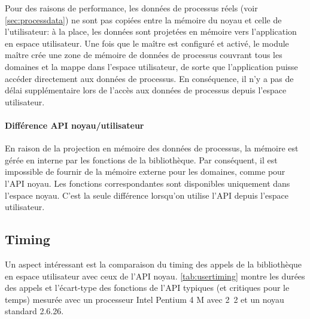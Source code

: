 \documentclass[a4paper,12pt,BCOR6mm,bibtotoc,idxtotoc]{scrbook}
\begin{document}
Pour des raisons de performance, les donn\'ees de processus r\'eels
(voir \autoref{sec:processdata}) ne sont pas copi\'ees entre la
m\'emoire du noyau et celle de l'utilisateur: \`a la place, les
donn\'ees sont projet\'ees en m\'emoire vers l'application en espace
utilisateur.  Une fois que le ma\^itre est configur\'e et activ\'e, le
module ma\^itre cr\'ee une zone de m\'emoire de donn\'ees de processus
couvrant tous les domaines et la mappe dans l'espace utilisateur, de
sorte que l'application puisse acc\'eder directement aux donn\'ees de
processus. En cons\'equence, il n'y a pas de d\'elai suppl\'ementaire lors
de l'acc\`es aux donn\'ees de processus depuis l'espace utilisateur.

\paragraph{Diff\'erence API noyau/utilisateur}
En raison de la projection en m\'emoire des donn\'ees de processus, la
m\'emoire est g\'er\'ee en interne par les fonctions de la biblioth\`eque.
Par cons\'equent, il est impossible de fournir de la m\'emoire externe
pour les domaines, comme pour l'API noyau.  Les fonctions
correspondantes sont disponibles uniquement dans l'espace noyau.
C'est la seule diff\'erence lorsqu'on utilise l'API depuis l'espace
utilisateur.

\subsection{Timing}
\label{sec:usertiming}

Un aspect int\'eressant est la comparaison du timing des appels de la
biblioth\`eque en espace utilisateur avec ceux de l'API noyau.
\autoref{tab:usertiming} montre les dur\'ees des appels et l'\'ecart-type
des fonctions de l'API typiques (et critiques pour le temps) mesur\'ee
avec un processeur Intel Pentium 4 M avec \unit{2.2}{\giga\hertz} et
un noyau standard 2.6.26.
\end{document}

